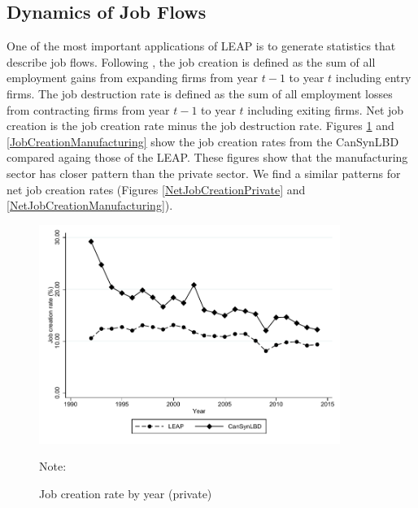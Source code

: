 \subsection{Dynamics of Job Flows}

One of the most important applications of LEAP is to generate statistics that describe job flows. Following \cite{DavisHaltiwangerSchuh}, the job creation is defined as the sum of all employment gains from expanding firms from year $t-1$ to year $t$ including entry firms. The job destruction rate is defined as the sum of all employment losses from contracting firms from year $t-1$ to year $t$ including exiting firms. Net job creation is the job creation rate minus the job destruction rate. Figures \ref{JobCreationPrivate} and \ref{JobCreationManufacturing} show the job creation rates from the CanSynLBD compared againg those of the LEAP. These figures show that the manufacturing sector has closer pattern than the private sector. We find a similar patterns for net job creation rates (Figures \ref{NetJobCreationPrivate} and  \ref{NetJobCreationManufacturing}).

\begin{figure} [H]
\centering
\caption{Job creation rate by year (private)} \label{JobCreationPrivate}
\includegraphics[height=2.8in, width=.7\linewidth]{graphs/Job_creation_rate_by_year_private_bw.pdf} 
\begin{minipage}{0.85\textwidth}
{\footnotesize Note: \TableNote \par}
\end{minipage}
\end{figure}

